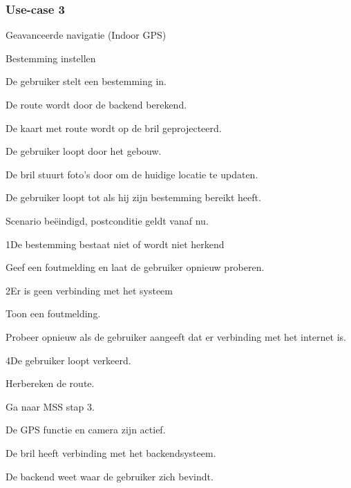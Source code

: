 \documentclass[12pt,a4paper,oneside]{article}
\begin{document}
\subsubsection{Use-case 3}
\begin{uc}{Geavanceerde navigatie (Indoor GPS)}

    \begin{uc-mss}{Bestemming instellen}
    \item De gebruiker stelt een bestemming in.
    \item De route wordt door de backend berekend.
    \item De kaart met route wordt op de bril geprojecteerd.
    \item De gebruiker loopt door het gebouw.
    \item De bril stuurt foto's door om de huidige locatie te updaten.
    \item De gebruiker loopt tot als hij zijn bestemming bereikt heeft.
\item Scenario be\"eindigd, postconditie geldt vanaf nu.
    \end{uc-mss}

    \begin{uc-ext}

        \begin{uc-fail}{1}{De bestemming bestaat niet of wordt niet herkend}
        \item Geef een foutmelding en laat de gebruiker opnieuw proberen.
        \end{uc-fail}
        
        \begin{uc-fail}{2}{Er is geen verbinding met het systeem}
        \item Toon een foutmelding. 
        \item Probeer opnieuw als de gebruiker aangeeft dat er verbinding met het internet is.
        \end{uc-fail}
        
        \begin{uc-fail}{4}{De gebruiker loopt verkeerd.}
        \item Herbereken de route.
        \item Ga naar MSS stap 3.
        \end{uc-fail}

    \end{uc-ext}

    \begin{uc-pre}
    \item De GPS functie en camera zijn actief.
    \item De bril heeft verbinding met het backendsysteem.
    \item De backend weet waar de gebruiker zich bevindt.
    \end{uc-pre}


\end{uc}
\end{document}
